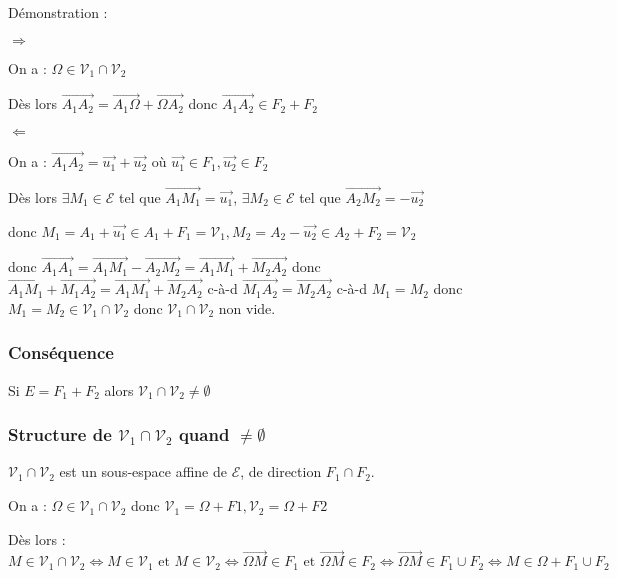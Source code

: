 \documentclass[12pt,a4paper,french]{book}
\begin{document}
				 Démonstration : 
				 
				 $\Rightarrow$
				 
				 On a : $\Omega \in \mathcal{V}_1 \cap\mathcal{V}_2$
				 
				 Dès lors $\overrightarrow{A_1 A_2} = \overrightarrow{A_1 \Omega} + \overrightarrow{\Omega A_2}$ donc $\overrightarrow{A_1 A_2} \in F_2 + F_2$
				 
				 $\Leftarrow$
				 
				 On a : $\overrightarrow{A_1 A_2} = \overrightarrow{u_1} +\overrightarrow{u_2}$ où $ \overrightarrow{u_1} \in F_1, \overrightarrow{u_2} \in F_2$
				 
				 Dès lors $\exists M_1 \in \mathcal{E}$ tel que  $\overrightarrow{A_1M_1} = \overrightarrow{u_1}$, $\exists M_2 \in \mathcal{E}$ tel que $\overrightarrow{A_2M_2} = -\overrightarrow{u_2}$
				 
				 donc $M_1 = A_1 + \overrightarrow{u_1} \in A_1 + F_1 = \mathcal{V}_1, M_2 = A_2 - \overrightarrow{u_2} \in A_2 + F_2 = \mathcal{V}_2$
				 
				 donc $\overrightarrow{A_1 A_1} = \overrightarrow{A_1M_1} - \overrightarrow{A_2M_2} = \overrightarrow{A_1M_1} +\overrightarrow{M_2A_2}$ donc $\overrightarrow{A_1M_1} + \overrightarrow{M_1A_2} = \overrightarrow{A_1M_1} +\overrightarrow{M_2A_2}$ c-à-d $\overrightarrow{M_1A_2} = \overrightarrow{M_2A_2}$ c-à-d $M_1 = M_2$ donc $M_1 = M_2 \in \mathcal{V}_1 \cap \mathcal{V}_2$ donc $\mathcal{V}_1 \cap \mathcal{V}_2$ non vide.
			
			\subsubsection{Conséquence}
				Si $E = F_1 + F_2$ alors $\mathcal{V}_1 \cap\mathcal{V}_2 \neq\emptyset$
			\subsubsection{Structure de $\mathcal{V}_1 \cap\mathcal{V}_2$ quand $\neq\emptyset$}
				 $\mathcal{V}_1 \cap\mathcal{V}_2$ est un sous-espace affine de $\mathcal{E}$, de direction $F_1 \cap F_2$.
				 
				 On a : $\Omega \in \mathcal{V}_1 \cap\mathcal{V}_2$ donc $\mathcal{V}_1 = \Omega + F1, \mathcal{V}_2 = \Omega + F2 $
				 
				Dès lors : $M \in \mathcal{V}_1 \cap\mathcal{V}_2 \Leftrightarrow M \in \mathcal{V}_1 \mbox{ et } M \in \mathcal{V}_2 \Leftrightarrow \overrightarrow{\Omega M} \in F_1 \mbox{ et } \overrightarrow{\Omega M} \in F_2 \Leftrightarrow \overrightarrow{\Omega M} \in F_1 \cup F_2 \Leftrightarrow M \in \Omega + F_1 \cup F_2$ 
				
\end{document}
